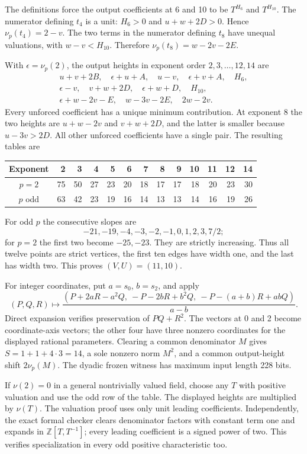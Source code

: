 \documentclass[11pt]{article}
\theoremstyle{remark}\newtheorem{remark}[theorem]{Remark}
\newcommand{\val}{\nu}
\newcommand{\Z}{\mathbb Z}
\begin{document}
The definitions force the output coefficients at 6 and 10 to be
$T^{H_6}$ and $T^{H_{10}}$. The numerator defining $t_4$ is a unit:
$H_6>0$ and $u+w+2D>0$. Hence $\val_p(t_4)=2-v$.
The two terms in the numerator defining $t_8$ have unequal valuations,
with $w-v<H_{10}$. Therefore
$\val_p(t_8)=w-2v-2E$.

With $\epsilon=\val_p(2)$, the output heights in exponent order
$2,3,\ldots,12,14$ are
\begin{gather*}
 u+v+2B,\quad \epsilon+u+A,\quad u-v,\quad \epsilon+v+A,\quad H_6,\\
 \epsilon-v,\quad v+w+2D,\quad \epsilon+w+D,\quad H_{10},\\
 \epsilon+w-2v-E,\quad w-3v-2E,\quad 2w-2v.
\end{gather*}
Every unforced coefficient has a unique minimum contribution. At
exponent 8 the two heights are $u+w-2v$ and $v+w+2D$, and the latter
is smaller because $u-3v>2D$. All other unforced coefficients have a
single pair. The resulting tables are
\begin{center}\small
\begin{tabular}{crrrrrrrrrrrr}
\toprule
Exponent&2&3&4&5&6&7&8&9&10&11&12&14\\
\midrule
$p=2$&75&50&27&23&20&18&17&17&18&20&23&30\\
$p$ odd&63&42&23&19&16&14&13&13&14&16&19&26\\
\bottomrule
\end{tabular}
\end{center}
For odd $p$ the consecutive slopes are
\[
 -21,-19,-4,-3,-2,-1,0,1,2,3,7/2;
\]
for $p=2$ the first two become $-25,-23$. They are strictly increasing.
Thus all twelve points are strict vertices, the first ten edges have
width one, and the last has width two. This proves $(V,U)=(11,10)$.

For integer coordinates, put $a=s_0$, $b=s_2$, and apply
\begin{equation}\label{eq:isometry}
 (P,Q,R)\longmapsto
 \frac{(P+2aR-a^2Q,\ -P-2bR+b^2Q,\ -P-(a+b)R+abQ)}{a-b}.
\end{equation}
Direct expansion verifies preservation of $PQ+R^2$. The vectors at
0 and 2 become coordinate-axis vectors; the other four have three
nonzero coordinates for the displayed rational parameters. Clearing a
common denominator $M$ gives $S=1+1+4\cdot3=14$, a sole nonzero norm
$M^2$, and a common output-height shift $2\val_p(M)$. The dyadic
frozen witness has maximum input length 228 bits.

If $\val(2)=0$ in a general nontrivially valued field, choose any $T$
with positive valuation and use the odd row of the table. The displayed
heights are multiplied by $\val(T)$. The valuation proof uses only
unit leading coefficients. Independently, the exact formal checker
clears denominator factors with constant term one and expands in
$\Z[T,T^{-1}]$; every leading coefficient is a signed power of two.
This verifies specialization in every odd positive characteristic too.
\end{document}
